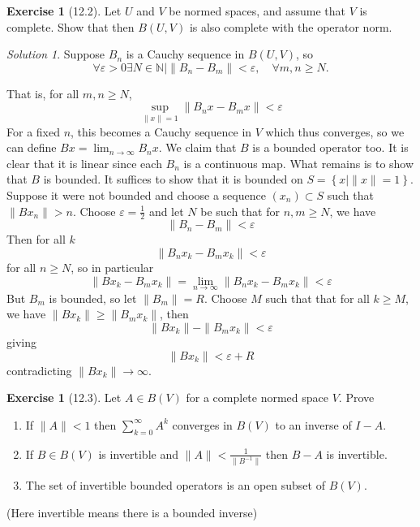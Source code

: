 \documentclass[reqno]{amsart}
\theoremstyle{definition}
\newtheorem{exercise}[theorem]{Exercise}
\theoremstyle{remark}
\newtheorem*{solution}{Solution}
\begin{document}
    

\begin{exercise}[12.2]
    Let $U$ and $V$ be normed spaces, and assume that $V$ is complete.
    Show that then $B(U,V)$ is also complete with the operator
    norm.
\end{exercise}

\begin{solution}
    Suppose $B_n$ is a Cauchy sequence
    in $B \left( U,V \right) $, so
    \[
    \forall \varepsilon > 0 \exists N \in \mathbb{N}  \mid 
    \|B_n - B_m\|< \varepsilon, \quad \forall m,n \ge N.
    \] 

    That is, for all $m, n \ge N$,
    \[
    \sup_{\|x\|= 1} \|B_n x - B_m x \| < \varepsilon
    \] 
    For a fixed $n$, this becomes a Cauchy sequence
    in $V$ which thus converges, so we can define
    $Bx = \lim_{n \to \infty} B_n x$.
    We claim that $B$ is a bounded operator too.
    It is clear that it is linear since each $B_n$ is a 
    continuous map. What remains is to show that
    $B$ is bounded. It suffices to show that
    it is bounded on $ S = \left\{ x  \mid \|x \|= 1 \right\} $.
    Suppose it were not bounded and choose
    a sequence $\left( x_n \right) \subset S$ such that
    $\|Bx_n\|> n$.
    Choose $\varepsilon = \frac{1}{2}$ and let
    $N$ be such that for $n, m \ge N$, we have
    \[
    \|B_n - B_m\|< \varepsilon
    \] 
    Then for all $k$
    \[
    \|B_n x_k -  B_m x_k \|< \varepsilon
    \] 
    for all $n \ge N$, so in particular
    \[
    \|Bx_k - B_m x_k\|
    = \lim_{n \to \infty} \|B_n x_k -  B_m x_k \|< \varepsilon
    \] 
    But $B_m$ is bounded, so let $\|B_m\| = R$.
    Choose $M$ such that that for all $k \ge M$, we have
    $\|Bx_k \| \ge \|B_m x_k\|$, then
    \[
    \|B x_k\| - \|B_m x_k\| < \varepsilon
    \] 
    giving
    \[
    \|B x_k\| < \varepsilon + R
    \] 
    contradicting $\|Bx_k\| \to \infty$.

\end{solution}

    \begin{exercise}[12.3]
        Let $A \in B(V)$ for a complete normed space
        $V$. Prove
        \begin{enumerate}
            \item If $\|A\| < 1$ then
                $\sum_{k=0}^{\infty} A^{k}$ converges
                in $B(V)$ to an inverse of $I - A$.
            \item If $B \in B(V)$ is invertible and
                $\|A\| < \frac{1}{\|B^{-1}\|}$ then
                $B - A$ is invertible.
            \item The set of invertible bounded operators is an
                open subset of $B(V)$.
        \end{enumerate}
        (Here invertible means there is a bounded inverse)
    \end{exercise}
\end{document}
